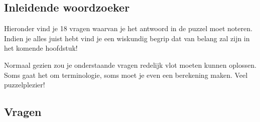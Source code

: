 \documentclass[12pt]{article}
\begin{document}
\begin{theorie}
\thispagestyle{empty}
\newpage
\thispagestyle{empty}
\tableofcontents
\newpage
\clearpage
{}
\pagestyle{fancy}
\lhead{}
\fancyhead[RE,LO]{}

\onehalfspacing

\vspace*{-2cm}
\section*{Inleidende woordzoeker}
Hieronder vind je 18 vragen waarvan je het antwoord in de puzzel moet noteren. Indien je alles juist hebt vind je een wiskundig begrip dat van belang zal zijn in het komende hoofdstuk!

Normaal gezien zou je onderstaande vragen redelijk vlot moeten kunnen oplossen. Soms gaat het om terminologie, soms moet je even een berekening maken. Veel puzzelplezier!

\subsection*{Vragen}


\end{theorie}
\end{document}
